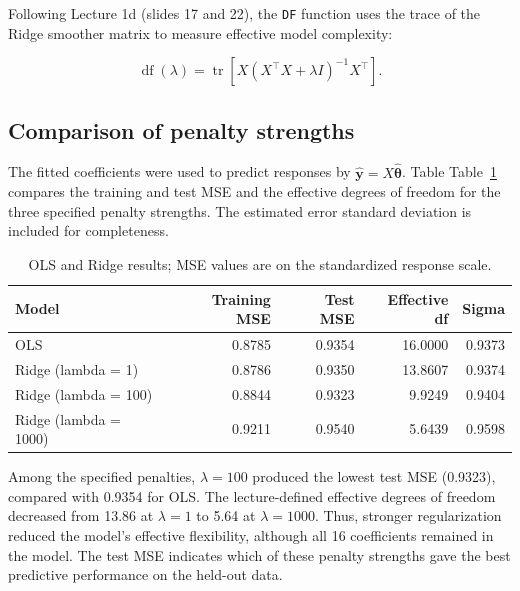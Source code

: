 \documentclass[
  english,
  11pt,
]{article}
\begin{document}
Following Lecture 1d (slides 17 and 22), the \texttt{DF} function uses
the trace of the Ridge smoother matrix to measure effective model
complexity:

\[
\operatorname{df}(\lambda)
=\operatorname{tr}\!\left[
X(X^\top X+\lambda I)^{-1}X^\top
\right].
\]

\subsection{Comparison of penalty
strengths}\label{comparison-of-penalty-strengths}

The fitted coefficients were used to predict responses by
\(\hat{\mathbf y}=X\hat{\boldsymbol\theta}\). Table
Table~\ref{tbl-a2-models} compares the training and test MSE and the
effective degrees of freedom for the three specified penalty strengths.
The estimated error standard deviation is included for completeness.

\begin{longtable}[]{@{}lrrrr@{}}

\caption{\label{tbl-a2-models}OLS and Ridge results; MSE values are on
the standardized response scale.}

\tabularnewline

\toprule\noalign{}
Model & Training MSE & Test MSE & Effective df & Sigma \\
\midrule\noalign{}
\endhead
\bottomrule\noalign{}
\endlastfoot
OLS & 0.8785 & 0.9354 & 16.0000 & 0.9373 \\
Ridge (lambda = 1) & 0.8786 & 0.9350 & 13.8607 & 0.9374 \\
Ridge (lambda = 100) & 0.8844 & 0.9323 & 9.9249 & 0.9404 \\
Ridge (lambda = 1000) & 0.9211 & 0.9540 & 5.6439 & 0.9598 \\

\end{longtable}

Among the specified penalties, \(\lambda = 100\) produced the lowest
test MSE (0.9323), compared with 0.9354 for OLS. The lecture-defined
effective degrees of freedom decreased from 13.86 at \(\lambda=1\) to
5.64 at \(\lambda=1000\). Thus, stronger regularization reduced the
model's effective flexibility, although all 16 coefficients remained in
the model. The test MSE indicates which of these penalty strengths gave
the best predictive performance on the held-out data.
\end{document}

